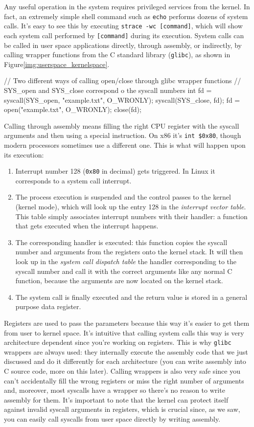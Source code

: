 \documentclass[10pt]{book}
\begin{document}
Any useful operation in the system requires privileged services from the kernel. In fact, an extremely simple shell command such as \verb|echo| performs dozens of system calls. It's easy to see this by executing \verb|strace -wc [command]|, which will show each system call performed by \verb|[command]| during its execution. System calls can be called in user space applications directly, through assembly, or indirectly, by calling wrapper functions from the C standard library (\verb|glibc|), as shown in Figure\ref{img:userspace_kernelspace}. 
\begin{code}
// Two different ways of calling open/close through glibc wrapper functions 
// SYS_open and SYS_close correspond o the syscall numbers
int fd = syscall(SYS_open, "example.txt", O_WRONLY);
syscall(SYS_close, fd);
fd = open("example.txt", O_WRONLY);
close(fd);
\end{code}
Calling through assembly means filling the right CPU register with the syscall arguments and then using a special instruction. On x86 it's \verb|int $0x80|, though modern processors sometimes use a different one. This is what will happen upon its execution:
\begin{enumerate}
    \item Interrupt number 128 (\verb|0x80| in decimal) gets triggered. In Linux it corresponds to a system call interrupt. 
    \item The process execution is suspended and the control passes to the kernel (kernel mode), which will look up the entry 128 in the \textit{interrupt vector table}. This table simply associates interrupt numbers with their handler: a function that gets executed when the interrupt happens.
    \item The corresponding handler is executed: this function copies the syscall number and arguments from the registers onto the kernel stack. It will then look up in the \textit{system call dispatch table} the handler corresponding to the syscall number and call it with the correct arguments like any normal C function, because the arguments are now located on the kernel stack.
    \item The system call is finally executed and the return value is stored in a general purpose data register.
\end{enumerate}
Registers are used to pass the parameters because this way it's easier to get them from user to kernel space. It's intuitive that calling system calls this way is very architecture dependent since you're working on registers. This is why \verb|glibc| wrappers are always used: they internally execute the assembly code that we just discussed and do it differently for each architecture (you can write assembly into C source code, more on this later). Calling wrappers is also very safe since you can't accidentally fill the wrong registers or miss the right number of arguments and, moreover, most syscalls have a wrapper so there's no reason to write assembly for them. It's important to note that the kernel can protect itself against invalid syscall arguments in registers, which is crucial since, as we saw, you can easily call syscalls from user space directly by writing assembly.
\end{document}
